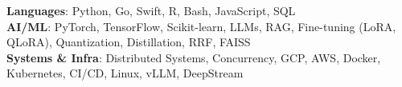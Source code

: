 \documentclass[letterpaper,10pt]{article}
\begin{document}
\begin{itemize}[leftmargin=0.15in, label={}]
  \small{\item{
    \textbf{Languages}{: Python, Go, Swift, R, Bash, JavaScript, SQL} \\
    \textbf{AI/ML}{: PyTorch, TensorFlow, Scikit-learn, LLMs, RAG, Fine-tuning (LoRA, QLoRA), Quantization, Distillation, RRF, FAISS} \\
    \textbf{Systems \& Infra}{: Distributed Systems, Concurrency, GCP, AWS, Docker, Kubernetes, CI/CD, Linux, vLLM, DeepStream}
  }}
\end{itemize}

\end{document}
